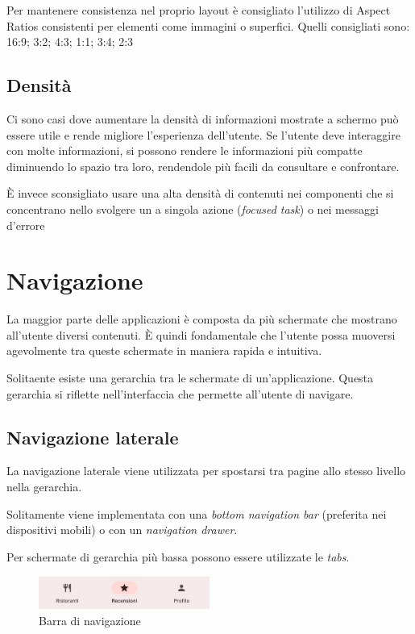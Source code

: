 \documentclass[12pt, a4paper]{report}
\begin{document}
			Per mantenere consistenza nel proprio layout è consigliato l'utilizzo di Aspect Ratios consistenti per elementi come immagini o superfici. Quelli consigliati sono: 16:9; 3:2; 4:3; 1:1; 3:4; 2:3 \cite{layout_containers}

		\subsection{Densità}
			Ci sono casi dove aumentare la densità di informazioni mostrate a schermo può essere utile e rende migliore l'esperienza dell'utente.
			Se l'utente deve interaggire con molte informazioni, si possono rendere le informazioni più compatte diminuendo lo spazio tra loro, rendendole più facili da consultare e confrontare.

			È invece sconsigliato usare una alta densità di contenuti nei componenti che si concentrano nello svolgere un a singola azione (\textit{focused task}) o nei messaggi d'errore

		
	\section{Navigazione}
    	La maggior parte delle applicazioni è composta da più schermate che mostrano all’utente diversi contenuti. È quindi fondamentale che l’utente possa muoversi agevolmente tra queste schermate in maniera rapida e intuitiva.

    	Solitaente esiste una gerarchia tra le schermate di un'applicazione. Questa gerarchia si riflette nell'interfaccia che permette all'utente di navigare.

    		\subsection{Navigazione laterale}
    		La navigazione laterale viene utilizzata per spostarsi tra pagine allo stesso livello nella gerarchia.

    		Solitamente viene implementata con una \textit{bottom navigation bar} (preferita nei dispositivi mobili) o con un \textit{navigation drawer}.

    		Per schermate di gerarchia più bassa possono essere utilizzate le \textit{tabs}.
    		
    		\begin{figure}[h]
   			\centering
   			\includegraphics[width=0.5\textwidth]{navbar}
 			\caption{Barra di navigazione}
    			\label{fig:mesh1}
		\end{figure}
\end{document}

